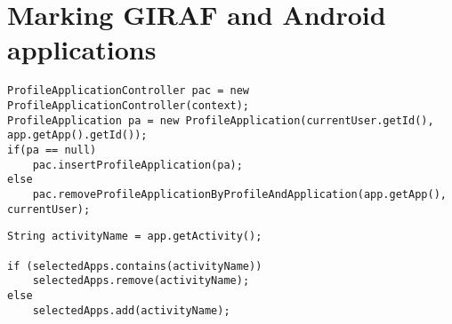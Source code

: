 \section{Marking GIRAF and Android applications}\label{appendix:markingapps}

\begin{lstlisting}[caption={The methods used for adding or removing a Giraf application to a user}, label={lst:addinggirafapplications}]
ProfileApplicationController pac = new ProfileApplicationController(context);
ProfileApplication pa = new ProfileApplication(currentUser.getId(), app.getApp().getId());
if(pa == null)
	pac.insertProfileApplication(pa);
else
	pac.removeProfileApplicationByProfileAndApplication(app.getApp(), currentUser);
\end{lstlisting}

\begin{lstlisting}[caption={The methods used for adding or removing an Android application to a user. Please note that the documentation has been removed.}, label={lst:addingandroidapplications}]
String activityName = app.getActivity();

if (selectedApps.contains(activityName))
    selectedApps.remove(activityName);
else
    selectedApps.add(activityName);
\end{lstlisting}